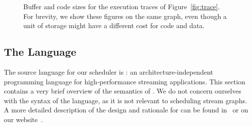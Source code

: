 \documentclass{sig-alt-full}
\begin{document}
\begin{comment}

\subsection{Minimum Buffer Size between {\filters}}

As illustrated above, the amount of buffering in a {\pipeline} can
be affected greatly by the order of executions of {\filters} in the
{\pipeline}.  The following equation calculates the minimal buffer
size required in order for two {\filters} to be able to push data
between each other indefinitely in the most buffer-efficient way.
Buffers this size cannot always be achieved, because some
components require that data be buffered up for execution (ex.
{\feedbackloops} require data to exist internally in order to
execution to advance) or because extra latency constrains require
additional buffering.

\begin{equation}
buffer_{A \to B} = \left\lceil {{peek_B} \over {\gcd(push_A,
pop_B)}} - 1 \right\rceil \gcd (push_A, pop_B) + push_A
\end{equation}

\emph{I can explain this equation, but I cannot prove it.  what
should I do with this?  it's not necessary for the thesis, but it
is a neat result we never published (PLDI submission), nor have I
seen it in any other papers (nobody does peeking, so it can't be
anywhere else)}

\end{comment}

\begin{figure}[t]
\caption{\small Buffer and code sizes for the execution traces of
Figure~\ref{fig:trace}.  For brevity, we show these figures on the
same graph, even though a unit of storage might have a different cost
for code and data.\protect\label{fig:codedata}}
\end{figure}

%

\subsection{The {\StreamIt} Language}
\label{sec:streamit}

The source language for our scheduler is {\StreamIt}: an
architecture-independent programming language for high-performance
streaming applications.  This section contains a very brief overview
of the semantics of {\StreamIt}.  We do not concern ourselves with the
syntax of the language, as it is not relevant to scheduling stream
graphs. A more detailed description of the design and rationale for
{\StreamIt} can be found in~\cite{thies02streamit} or on our
website~\cite{streamitweb}.
\end{document}
